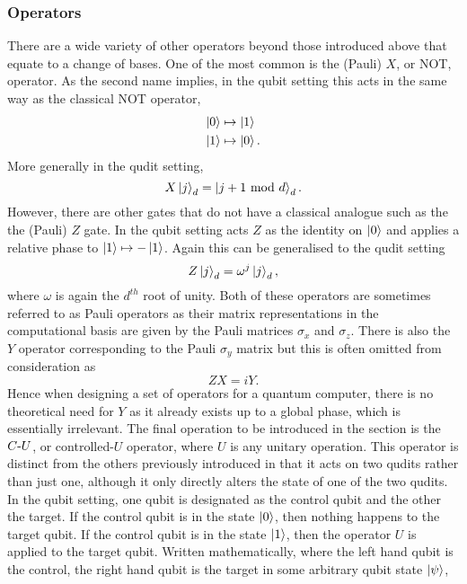 \subsubsection{Operators}
\label{subsubsection:operators}
There are a wide variety of other operators beyond those introduced above that equate to a change of bases.
One of the most common is the (Pauli) $X$, or NOT, operator.
As the second name implies, in the qubit setting this acts in the same way as the classical NOT operator,
\begin{align}
    \ket{0} &\mapsto \ket{1}\\
    \ket{1} &\mapsto \ket{0}.
\end{align}
More generally in the qudit setting,
\begin{equation}
    X\ket{j}_d = \ket{j + 1 \text{ mod } d}_d.
\end{equation}
However, there are other gates that do not have a classical analogue such as the  the (Pauli) $Z$ gate.
In the qubit setting acts $Z$ as the identity on $\ket{0}$ and applies a relative phase to $\ket{1} \mapsto -\ket{1}$.
Again this can be generalised to the qudit setting
\begin{equation}
    Z\ket{j}_d = \omega^j\ket{j}_d,
\end{equation}
where $\omega$ is again the $d^{th}$ root of unity.
Both of these operators are sometimes referred to as Pauli operators as their matrix representations in the computational basis are given by the Pauli matrices $\sigma_x$ and $\sigma_z$.
There is also the $Y$ operator corresponding to the Pauli $\sigma_y$ matrix but this is often omitted from consideration as
\begin{equation}
    ZX = iY.
\end{equation}
Hence when designing a set of operators for a quantum computer, there is no theoretical need for $Y$ as it already exists up to a global phase, which is essentially irrelevant.
The final operation to be introduced in the section is the $C\text{-}U$, or controlled-$U$ operator, where $U$ is any unitary operation.
This operator is distinct from the others previously introduced in that it acts on two qudits rather than just one, although it only directly alters the state of one of the two qudits.
In the qubit setting, one qubit is designated as the control qubit and the other the target.
If the control qubit is in the state $\ket{0}$, then nothing happens to the target qubit.
If the control qubit is in the state $\ket{1}$, then the operator $U$ is applied to the target qubit.
Written mathematically, where the left hand qubit is the control, the right hand qubit is the target in some arbitrary qubit state $\ket{\psi}$,
